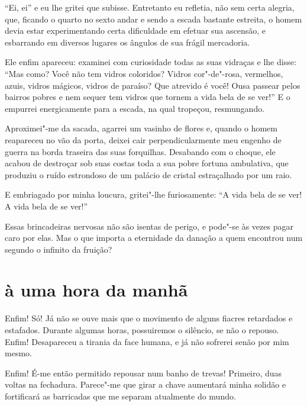 ``Ei, ei'' e eu lhe gritei que subisse.
Entretanto eu refletia, não sem certa alegria, que, ficando o quarto
no sexto andar e sendo a escada bastante estreita, o
homem devia estar experimentando certa dificuldade em efetuar sua
ascensão, e esbarrando em diversos lugares os ângulos de sua frágil
mercadoria.

Ele enfim apareceu: examinei com curiosidade todas as suas vidraças e
lhe disse: ``Mas como? Você não tem vidros coloridos?
Vidros cor"-de"-rosa, vermelhos, azuis, vidros mágicos, vidros de
paraíso? Que atrevido é você! Ousa passear pelos bairros pobres e nem
sequer tem vidros que tornem a vida bela de se ver!'' E
o empurrei energicamente para a escada, na qual tropeçou, resmungando.

Aproximei"-me da sacada, agarrei um vasinho de flores e, quando o
homem reapareceu no vão da porta, deixei cair perpendicularmente meu
engenho de guerra na borda traseira das suas forquilhas. Desabando
com o choque, ele acabou de destroçar sob suas costas toda a sua pobre
fortuna ambulativa, que produziu o ruído estrondoso de um palácio de
cristal estraçalhado por um raio.

E embriagado por minha loucura, gritei"-lhe furiosamente:
``A vida bela de se ver! A vida bela de se
ver!''

Essas brincadeiras nervosas não são isentas de perigo, e pode"-se às
vezes pagar caro por elas. Mas o que importa a eternidade da danação a
quem encontrou num segundo o infinito da fruição?

\quebra\section[À uma hora da manhã]{à uma hora da manhã}

Enfim! Só! Já não se ouve mais que o movimento de alguns fiacres retardados
e estafados. Durante algumas horas, possuiremos o silêncio, se não o
repouso. Enfim! Desapareceu a tirania da face humana, e já não sofrerei
senão por mim mesmo.

Enfim! É-me então permitido repousar num banho de trevas! Primeiro, duas
voltas na fechadura. Parece"-me que girar a chave aumentará minha
solidão e fortificará as barricadas que me separam atualmente do mundo.

